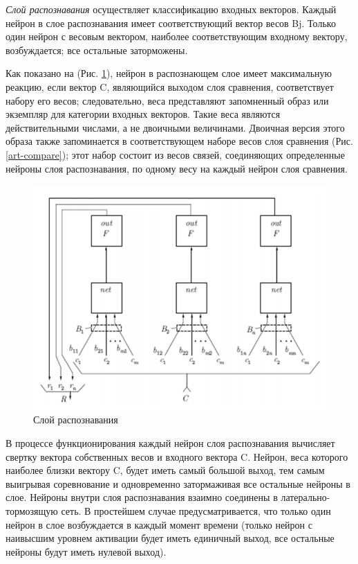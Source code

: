 \documentclass[14pt,a4paper,report]{article}
\begin{document}
\textit{Слой распознавания} осуществляет классификацию входных векторов. Каждый нейрон в слое распознавания имеет соответствующий вектор весов Bj. Только один нейрон с весовым вектором, наиболее соответствующим входному вектору, возбуждается; все остальные заторможены. 

Как показано на (Рис. \ref{art-recognition}), нейрон в распознающем слое имеет максимальную реакцию, если вектор C, являющийся выходом слоя сравнения, соответствует набору его весов; следовательно, веса представляют запомненный образ или экземпляр для категории входных векторов. Такие веса являются действительными числами, а не двоичными величинами. Двоичная версия этого образа также запоминается в соответствующем наборе весов слоя сравнения (Рис. \ref{art-compare}); этот набор состоит из весов связей, соединяющих определенные нейроны слоя распознавания, по одному весу на каждый нейрон слоя сравнения.

\begin{figure}[h!]
	\centering
	\includegraphics[scale = 0.88]{images/5.png}
	\caption{Слой распознавания}
	\label{art-recognition}
\end{figure}

В процессе функционирования каждый нейрон слоя распознавания вычисляет свертку вектора собственных весов и входного вектора C. Нейрон, веса которого наиболее близки вектору C, будет иметь самый большой выход, тем самым выигрывая соревнование и одновременно затормаживая все остальные нейроны в слое. Нейроны внутри слоя распознавания взаимно соединены в латерально-тормозящую сеть. В простейшем случае предусматривается, что только один нейрон в слое возбуждается в каждый момент времени (только нейрон с наивысшим уровнем активации будет иметь единичный выход, все остальные нейроны будут иметь нулевой выход).
\end{document}
